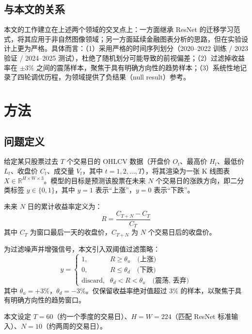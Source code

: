 \documentclass[12pt,a4paper]{ctexart}
\begin{document}
\subsection{与本文的关系}

本文的工作建立在上述两个领域的交叉点上：一方面继承 ResNet 的迁移学习范式，将其应用于非自然图像领域；另一方面延续金融图表分析的思路，但在实验设计上更为严格。具体而言：（1）采用严格的时间序列划分（2020--2022 训练 / 2023 验证 / 2024--2025 测试），杜绝了随机划分可能导致的前视偏差；（2）过滤掉收益率在 $\pm 3\%$ 之间的震荡样本，聚焦于具有明确方向性的趋势样本；（3）系统性地记录了四轮调优历程，为领域提供了负结果（null result）参考。

\section{方法}

\subsection{问题定义}

给定某只股票过去 $T$ 个交易日的 OHLCV 数据（开盘价 $O_t$、最高价 $H_t$、最低价 $L_t$、收盘价 $C_t$、成交量 $V_t$，其中 $t=1,2,\dots,T$），将其渲染为一张 K 线图表 $X \in \mathbb{R}^{H \times W \times 3}$。模型的目标是预测该股票在未来 $N$ 个交易日的涨跌方向，即二分类标签 $y \in \{0, 1\}$，其中 $y=1$ 表示``上涨''，$y=0$ 表示``下跌''。

未来 $N$ 日的累计收益率定义为：
\begin{equation}
R = \frac{C_{T+N} - C_T}{C_T}
\end{equation}
其中 $C_T$ 为窗口最后一天的收盘价，$C_{T+N}$ 为 $N$ 个交易日后的收盘价。

为过滤噪声并增强信号，本文引入双阈值过滤策略：
\begin{equation}
y = \begin{cases}
1, & R \geq \theta_u \quad \text{(上涨)}\\
0, & R \leq \theta_d \quad \text{(下跌)}\\
\text{discard}, & \theta_d < R < \theta_u \quad \text{(震荡, 丢弃)}
\end{cases}
\end{equation}
其中 $\theta_u = +3\%$，$\theta_d = -3\%$。仅保留收益率绝对值超过 3\% 的样本，以聚焦于具有明确方向性的趋势窗口。

本文设定 $T=60$（约一个季度的交易日）、$H=W=224$（匹配 ResNet 标准输入）、$N=10$（约两周的交易日）。
\end{document}
